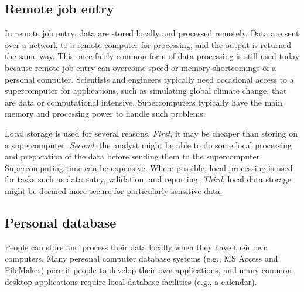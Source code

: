 \documentclass[
]{article}
\begin{document}
\hypertarget{remote-job-entry}{%
\subsection*{Remote job entry}\label{remote-job-entry}}

In remote job entry, data are stored locally and processed remotely.
Data are sent over a network to a remote computer for processing, and
the output is returned the same way. This once fairly common form of
data processing is still used today because remote job entry can
overcome speed or memory shortcomings of a personal computer. Scientists
and engineers typically need occasional access to a supercomputer for
applications, such as simulating global climate change, that are data or
computational intensive. Supercomputers typically have the main memory
and processing power to handle such problems.

Local storage is used for several reasons. \emph{First}, it may be cheaper
than storing on a supercomputer. \emph{Second}, the analyst might be able to
do some local processing and preparation of the data before sending them
to the supercomputer. Supercomputing time can be expensive. Where
possible, local processing is used for tasks such as data entry,
validation, and reporting. \emph{Third}, local data storage might be deemed
more secure for particularly sensitive data.

\hypertarget{personal-database}{%
\subsection*{Personal database}\label{personal-database}}

People can store and process their data locally when they have their own
computers. Many personal computer database systems (e.g., MS Access and
FileMaker) permit people to develop their own applications, and many
common desktop applications require local database facilities (e.g., a
calendar).
\end{document}
